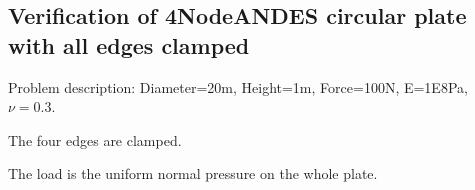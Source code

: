 \documentclass[fleqn,11pt]{article}
\begin{document}

























\newpage
\subsection{Verification of 4NodeANDES circular plate with all edges clamped}

Problem description: Diameter=20m, Height=1m, Force=100N, E=1E8Pa, $\nu=0.3$. 

The four edges are clamped. 

The load is the uniform normal pressure on the whole plate. 
\end{document}
